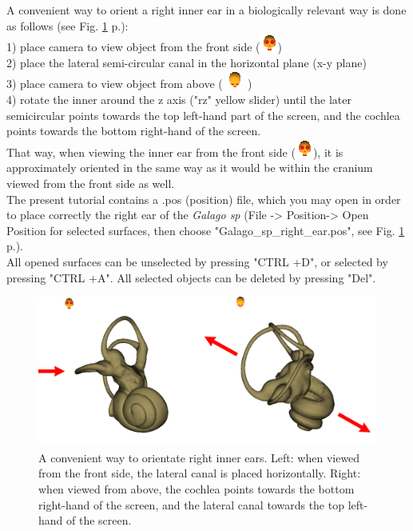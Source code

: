 \documentclass[12pt, a4paper]{book}
\begin{document}
A convenient way to orient a right inner ear in a biologically relevant way is done as follows (see Fig. \ref{orientation} p.\pageref{orientation}):\\
1) place camera to view object from the front side (\includegraphics[scale=0.7]{../images/06/camera/camera_front.png})\\
2) place the lateral semi-circular canal in the horizontal plane (x-y plane)\\
3) place camera  to view object from above ( \includegraphics[scale=0.7]{../images/06/camera/camera_above.png} )\\
4) rotate the inner around the z axis ("rz" yellow slider) until the later semicircular points towards the top left-hand part of the screen, and the cochlea points towards the bottom right-hand of the screen.\\
That way, when viewing the inner ear from the front side (\includegraphics[scale=0.7]{../images/06/camera/camera_front.png}), it is approximately oriented in the same way as it would be within the cranium viewed from the front side as well.\\

The present tutorial contains a .pos (position) file, which you may open in order to place correctly the right ear of the \textit{Galago sp} (File -> Position-> Open Position for selected surfaces, then choose "Galago\_sp\_right\_ear.pos", see Fig. \ref{orientation} p.\pageref{orientation}).\\
All opened surfaces can be unselected by pressing "CTRL +D", or selected by pressing "CTRL +A". All selected objects can be deleted by pressing "Del".

\begin{figure}
  \centering
  \includegraphics[scale=0.3]{pos.png} 
	\caption{A convenient way to orientate right inner ears.  Left: when viewed from the front side, the lateral canal is placed horizontally. Right: when viewed from above, the cochlea points towards the bottom right-hand of the screen, and the lateral canal towards the top left-hand of the screen.}
\label{orientation}
 
\end{figure}
\end{document}
